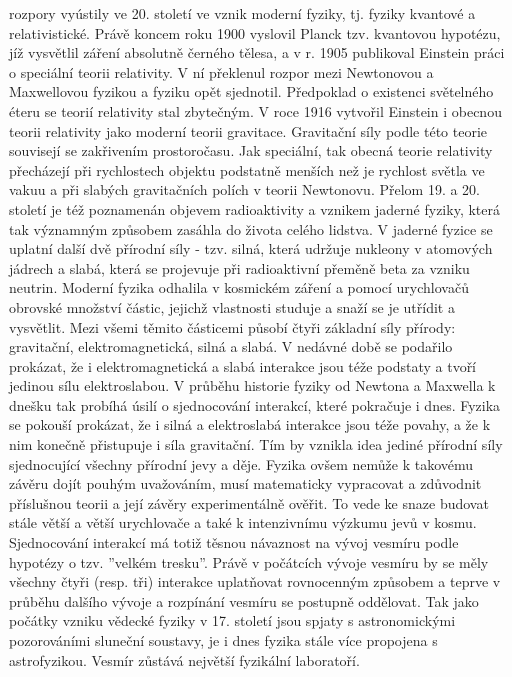     rozpory vyústily ve 20. století ve vznik moderní fyziky, tj. fyziky kvantové a relativistické. Právě 
    koncem roku 1900 vyslovil Planck tzv. kvantovou hypotézu, jíž vysvětlil záření absolutně černého 
    tělesa, a v r. 1905 publikoval Einstein práci o speciální teorii relativity. V ní překlenul rozpor 
    mezi Newtonovou a Maxwellovou fyzikou a fyziku opět sjednotil. Předpoklad o existenci světelného 
    éteru se teorií relativity stal zbytečným. V roce 1916 vytvořil Einstein i obecnou teorii
    relativity jako moderní teorii gravitace. Gravitační síly podle této teorie souvisejí se zakřivením 
    prostoročasu. Jak speciální, tak obecná teorie relativity přecházejí při rychlostech objektu 
    podstatně menších než je rychlost světla ve vakuu a při slabých gravitačních polích v teorii 
    Newtonovu. Přelom 19. a 20. století je též poznamenán objevem radioaktivity a vznikem jaderné fyziky, 
    která tak významným způsobem zasáhla do života celého lidstva. V jaderné fyzice se uplatní další dvě 
    přírodní síly - tzv. silná, která udržuje nukleony v atomových jádrech a slabá, která se projevuje 
    při radioaktivní přeměně beta za vzniku neutrin. Moderní fyzika odhalila v kosmickém záření a pomocí 
    urychlovačů obrovské množství částic, jejichž vlastnosti studuje a snaží se je utřídit a vysvětlit. 
    Mezi všemi těmito částicemi působí čtyři základní síly přírody: gravitační, elektromagnetická, silná 
    a slabá. V nedávné době se podařilo prokázat, že i elektromagnetická a slabá interakce jsou téže 
    podstaty a tvoří jedinou sílu elektroslabou. V průběhu historie fyziky od Newtona a Maxwella k dnešku 
    tak probíhá úsilí o sjednocování interakcí, které pokračuje i dnes. Fyzika se pokouší prokázat, že i 
    silná a elektroslabá interakce jsou téže povahy, a že k nim konečně přistupuje i síla gravitační. Tím 
    by vznikla idea jediné přírodní síly sjednocující všechny přírodní jevy a děje. Fyzika ovšem nemůže k 
    takovému závěru dojít pouhým uvažováním, musí matematicky vypracovat a zdůvodnit příslušnou teorii a 
    její závěry experimentálně ověřit. To vede ke snaze budovat stále větší a větší urychlovače a také k 
    intenzivnímu výzkumu jevů v kosmu. Sjednocování interakcí má totiž těsnou návaznost na vývoj vesmíru 
    podle hypotézy o tzv. ”velkém tresku”. Právě v počátcích vývoje vesmíru by se měly všechny čtyři 
    (resp. tři) interakce uplatňovat rovnocenným způsobem a teprve v průběhu dalšího vývoje a rozpínání 
    vesmíru se postupně oddělovat. Tak jako počátky vzniku vědecké fyziky v 17. století jsou spjaty s 
    astronomickými pozorováními sluneční soustavy, je i dnes fyzika stále více propojena s astrofyzikou. 
    Vesmír zůstává největší fyzikální laboratoří.
  
